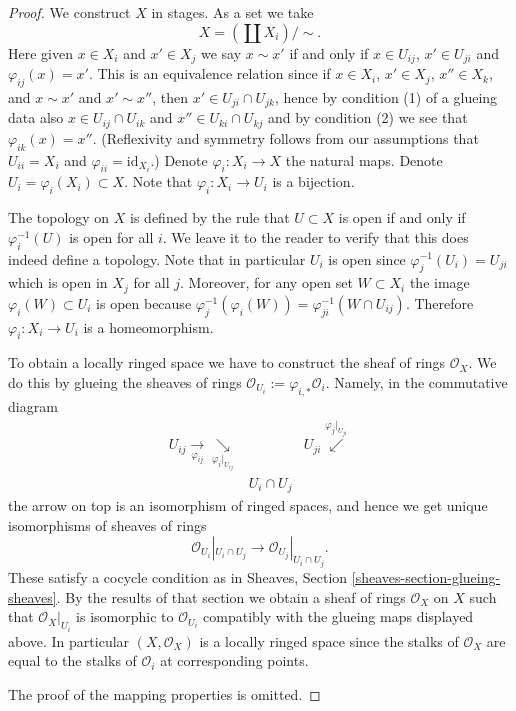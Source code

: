 \begin{proof}
We construct $X$ in stages.
As a set we take
$$
X = (\coprod X_i) / \sim.
$$
Here given $x \in X_i$ and $x' \in X_j$ we say
$x \sim x'$ if and only if $x \in U_{ij}$, $x' \in U_{ji}$
and $\varphi_{ij}(x) = x'$. This is an equivalence relation
since if $x \in X_i$, $x' \in X_j$, $x'' \in X_k$, and $x \sim x'$ and
$x' \sim x''$, then $x' \in U_{ji} \cap U_{jk}$, hence by condition (1) of
a glueing data also $x \in U_{ij} \cap U_{ik}$ and
$x'' \in U_{ki} \cap U_{kj}$ and by condition (2)
we see that $\varphi_{ik}(x) = x''$. (Reflexivity and symmetry
follows from our assumptions that $U_{ii} = X_i$ and
$\varphi_{ii} = \text{id}_{X_i}$.)
Denote $\varphi_i : X_i \to X$
the natural maps. Denote $U_i = \varphi_i(X_i) \subset X$.
Note that $\varphi_i : X_i \to U_i$ is a bijection.

\medskip\noindent
The topology on $X$ is defined by the rule that
$U \subset X$ is open if and only if $\varphi_i^{-1}(U)$
is open for all $i$. We leave it to the reader to verify
that this does indeed define a topology.
Note that in particular $U_i$ is open since $\varphi_j^{-1}(U_i)
= U_{ji}$ which is open in $X_j$ for all $j$.
Moreover, for any open set $W \subset X_i$ the image
$\varphi_i(W) \subset U_i$ is open because
$\varphi_j^{-1}(\varphi_i(W)) = \varphi_{ji}^{-1}(W \cap U_{ij})$.
Therefore $\varphi_i : X_i \to U_i$ is a homeomorphism.

\medskip\noindent
To obtain a locally ringed space we have to construct the
sheaf of rings $\mathcal{O}_X$. We do this by glueing the
sheaves of rings $\mathcal{O}_{U_i} := \varphi_{i, *} \mathcal{O}_i$.
Namely, in the commutative diagram
$$
\begin{array}{ccc}U_{ij} \underset{\varphi_{ij}}{\longrightarrow}\underset{\varphi_i|_{U_{ij}}}{\searrow} &  & U_{ji} \overset{\varphi_j|_{U_{ji}}}{\swarrow} \\  & U_i \cap U_j & \end{array}
$$
the arrow on top is an isomorphism of ringed spaces,
and hence we get unique isomorphisms of sheaves of rings
$$
\mathcal{O}_{U_i}|_{U_i \cap U_j}
\longrightarrow
\mathcal{O}_{U_j}|_{U_i \cap U_j}.
$$
These satisfy a cocycle condition as in Sheaves,
Section \ref{sheaves-section-glueing-sheaves}.
By the results of that section we obtain a sheaf of rings
$\mathcal{O}_X$ on $X$ such that $\mathcal{O}_X|_{U_i}$
is isomorphic to $\mathcal{O}_{U_i}$ compatibly with
the glueing maps displayed above.
In particular $(X, \mathcal{O}_X)$ is a locally ringed
space since the stalks of $\mathcal{O}_X$ are equal
to the stalks of $\mathcal{O}_i$ at corresponding
points.

\medskip\noindent
The proof of the mapping properties is omitted.
\end{proof}

